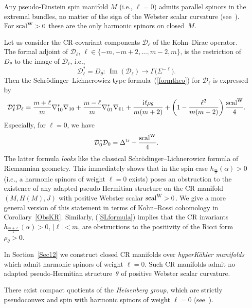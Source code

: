 \documentclass[pdftex]{sigma}
\numberwithin{equation}{section}
\begin{document}
\begin{Example}
Any pseudo-Einstein spin manifold $M$ (i.e., $\ell=0$) admits parallel spinors in the extremal bundles, no matter of the sign of the
Webster scalar curvature (see~\cite{LeiN2}). For ${\rm scal}^{\rm W}>0$ these are the only harmonic spinors on closed~$M$.
\end{Example}

Let us consider the CR-covariant components $\mathcal{D}_\ell$ of the Kohn--Dirac operator.
The formal adjoint of $\mathcal{D}_\ell$, $\ell\in\{-m,-m+2,\dots,m-2,m\}$, is the restriction of $D_\theta$ to the image of $\mathcal{D}_\ell$, i.e.,
\[
\mathcal{D}_\ell^*=D_\theta\colon \ \operatorname{Im}(\mathcal{D}_\ell) \to \Gamma\big(\Sigma^{-\ell}\big).
\]
Then the Schr\"odinger--Lichnerowicz-type formula~(\ref{formtheo}) for $\mathcal{D}_\ell$
is expressed by
\begin{gather}
\mathcal{D}_\ell^*\mathcal{D}_\ell = \frac{m+\ell}{m}\nabla^*_{10}\nabla_{10} + \frac{m-\ell}{m}\nabla^*_{01}\nabla_{01}
 + \frac{{\rm i}\ell\rho_\theta}{m(m+2)}
+\left(1-\frac{\ell^2}{m(m+2)}\right)\frac{{\rm scal}^{\rm W}}{4}.\label{SLformula}
\end{gather}
Especially, for $\ell=0$, we have
\[
\mathcal{D}_0^*\mathcal{D}_0 = \Delta^{\rm tr} + \frac{{\rm scal}^{\rm W}}{4}.
\]
The latter formula {\em looks} like the classical Schr\"odinger--Lichnerowicz formula of Riemannian geometry.
This immediately shows that in the spin case $h_{\frac{m}{2}}(\alpha)>0$ (i.e., a harmonic spinors of weight $\ell=0$ exists)
poses an obstruction to the existence of any adapted pseudo-Hermitian structure on the CR manifold $(M,H(M),J)$ with positive Webster scalar ${\rm scal}^{\rm W}>0$.
We give a more general version of this statement in terms of Kohn--Rossi cohomology in Corollary~\ref{ObsKR}.
Similarly, (\ref{SLformula}) implies that the CR invariants $h_{\frac{m+\ell}{2}}(\alpha)>0$, $|\ell|< m$, are obstructions
to the positivity of the Ricci form $\rho_\theta>0$.

\begin{Example} In Section~\ref{Sec12} we construct closed CR manifolds over {\em hyperK\"ahler manifolds} which admit harmonic spinors
of weight $\ell=0$. Such CR manifolds admit no adapted pseudo-Hermitian structure~$\theta$ of positive Webster scalar curvature.
\end{Example}
\begin{Example}
 There exist compact quotients of the {\em Heisenberg group}, which are strictly pseudoconvex and spin with harmonic spinors of weight $\ell=0$ (see~\cite{Stadt}).
\end{Example}
\end{document}
